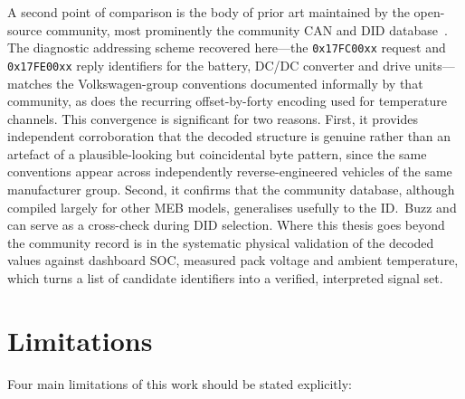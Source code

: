 \documentclass[11pt,a4paper,oneside,parskip=half]{scrreprt}
\providecommand{\hex}{}\renewcommand{\hex}[1]{\texttt{0x#1}}
\begin{document}
A second point of comparison is the body of prior art maintained by the open-source community, most prominently the community CAN and DID database~\cite{opendbc}. The diagnostic addressing scheme recovered here---the \hex{17FC00xx} request and \hex{17FE00xx} reply identifiers for the battery, DC/DC converter and drive units---matches the Volkswagen-group conventions documented informally by that community, as does the recurring offset-by-forty encoding used for temperature channels. This convergence is significant for two reasons. First, it provides independent corroboration that the decoded structure is genuine rather than an artefact of a plausible-looking but coincidental byte pattern, since the same conventions appear across independently reverse-engineered vehicles of the same manufacturer group. Second, it confirms that the community database, although compiled largely for other MEB models, generalises usefully to the ID.~Buzz and can serve as a cross-check during DID selection. Where this thesis goes beyond the community record is in the systematic physical validation of the decoded values against dashboard SOC, measured pack voltage and ambient temperature, which turns a list of candidate identifiers into a verified, interpreted signal set.

\section{Limitations}
Four main limitations of this work should be stated explicitly:
\end{document}
